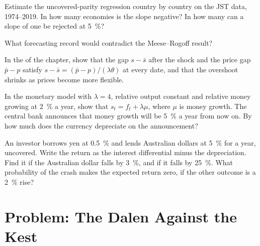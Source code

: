 \begin{exercise}[$\star\star$]\label{exo:b3:exchange-rates:8}
Estimate the uncovered-parity regression country by country on the JST data,
1974--2019. In how many economies is the slope negative? In how many can a slope of
one be rejected at 5~\%?
\end{exercise}

\begin{exercise}[$\star\star$]\label{exo:b3:exchange-rates:9}
What forecasting record would contradict the Meese--Rogoff result?
\end{exercise}

\begin{exercise}[$\star\star\star$]\label{exo:b3:exchange-rates:10}
In the  of the chapter, show that the gap $s - \bar s$ after the shock
and the price gap $\bar p - p$ satisfy $s - \bar s = (\bar p - p)/(\lambda\theta)$ at every date, and that the
overshoot shrinks as prices become more flexible.
\end{exercise}

\begin{exercise}[$\star\star\star$]\label{exo:b3:exchange-rates:11}
In the monetary model with $\lambda = 4$, relative output constant and relative money
growing at 2~\% a year, show that $s_t = f_t + \lambda\mu$, where $\mu$ is money growth. The central
bank announces that money growth will be 5~\% a year from now on. By how much does
the currency depreciate on the announcement?
\end{exercise}

\begin{exercise}[$\star\star\star$]\label{exo:b3:exchange-rates:12}
An investor borrows yen at 0.5~\% and lends Australian dollars at 5~\% for a year,
uncovered. Write the return as the interest differential minus the depreciation.
Find it if the Australian dollar falls by 3~\%, and if it falls by 25~\%. What
probability of the crash makes the expected return zero, if the other outcome is a
2~\% rise?
\end{exercise}

\section{Problem: The Dalen Against the Kest}\label{sec:b3:exchange-rates:problem}

